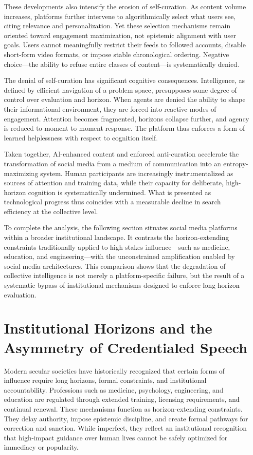 \documentclass[12pt]{article}
\begin{document}
These developments also intensify the erosion of self-curation. As content volume increases, platforms further intervene to algorithmically select what users see, citing relevance and personalization. Yet these selection mechanisms remain oriented toward engagement maximization, not epistemic alignment with user goals. Users cannot meaningfully restrict their feeds to followed accounts, disable short-form video formats, or impose stable chronological ordering. Negative choice—the ability to refuse entire classes of content—is systematically denied.

The denial of self-curation has significant cognitive consequences. Intelligence, as defined by efficient navigation of a problem space, presupposes some degree of control over evaluation and horizon. When agents are denied the ability to shape their informational environment, they are forced into reactive modes of engagement. Attention becomes fragmented, horizons collapse further, and agency is reduced to moment-to-moment response. The platform thus enforces a form of learned helplessness with respect to cognition itself.

Taken together, AI-enhanced content and enforced anti-curation accelerate the transformation of social media from a medium of communication into an entropy-maximizing system. Human participants are increasingly instrumentalized as sources of attention and training data, while their capacity for deliberate, high-horizon cognition is systematically undermined. What is presented as technological progress thus coincides with a measurable decline in search efficiency at the collective level.

To complete the analysis, the following section situates social media platforms within a broader institutional landscape. It contrasts the horizon-extending constraints traditionally applied to high-stakes influence—such as medicine, education, and engineering—with the unconstrained amplification enabled by social media architectures. This comparison shows that the degradation of collective intelligence is not merely a platform-specific failure, but the result of a systematic bypass of institutional mechanisms designed to enforce long-horizon evaluation.

\section{Institutional Horizons and the Asymmetry of Credentialed Speech}

Modern secular societies have historically recognized that certain forms of influence require long horizons, formal constraints, and institutional accountability. Professions such as medicine, psychology, engineering, and education are regulated through extended training, licensing requirements, and continual renewal. These mechanisms function as horizon-extending constraints. They delay authority, impose epistemic discipline, and create formal pathways for correction and sanction. While imperfect, they reflect an institutional recognition that high-impact guidance over human lives cannot be safely optimized for immediacy or popularity.
\end{document}
